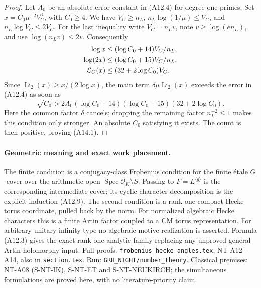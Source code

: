 \begin{proof}
Let \(A_0\) be an absolute error constant in (A12.4) for
degree-one primes. Set \(x=C_0\mu^{-2}V_C^6\), with
\(C_0\ge4\). We have \(V_C\ge n_L\),
\(n_L\log(1/\mu)\le V_C\), and
\(n_L\log V_C\le2V_C\).
For the last inequality write \(V_C=n_L v\), note
\(v\ge\log(e n_L)\), and use
\(\log(n_L v)\le2v\). Consequently
\[
 \begin{split}
 \log x&\le(\log C_0+14)V_C/n_L,\\
 \log(2x)&\le(\log C_0+15)V_C/n_L,\\
 {\cal L}_C(x)&\le(32+2\log C_0)V_C .
 \end{split}
\]
Since \(\operatorname{Li}_2(x)\ge x/(2\log x)\),
the main term \(\delta\mu\operatorname{Li}_2(x)\)
exceeds the error in (A12.4) as soon as
\[
 \sqrt{C_0}>
  2A_0(\log C_0+14)(\log C_0+15)(32+2\log C_0).
\]
Here the common factor \(\delta\) cancels; dropping the
remaining factor \(n_L^{-2}\le1\) makes this condition
only stronger. An absolute \(C_0\) satisfying it exists.
The count is then positive, proving (A14.1).
\end{proof}

\paragraph{Geometric meaning and exact work placement.}
The finite condition is a conjugacy-class Frobenius condition
for the finite \'{e}tale \(G\)-cover over the arithmetic open
\(\operatorname{Spec}\mathcal O_K\setminus S\). Passing to
\(F=L^{\langle g\rangle}\) is the corresponding intermediate
cover; its cyclic character decomposition is the explicit
induction (A12.9). The second condition is a rank-one
compact Hecke torus coordinate, pulled back by the norm.
For normalized algebraic Hecke characters this is a finite
Artin factor coupled to a CM torus representation. For
arbitrary unitary infinity type no algebraic-motive
realization is asserted. Formula (A12.3) gives the exact
rank-one analytic family replacing any unproved general
Artin-holomorphy input.
Full proofs: \texttt{frobenius\_hecke\_angles.tex},
NT-A12--A14, also in \texttt{section.tex}.
Run: \texttt{GRH\_NIGHT/number\_theory}.
Classical premises: NT-A08 (S-NT-IK), S-NT-ET and
S-NT-NEUKIRCH; the simultaneous formulations are proved
here, with no literature-priority claim.
